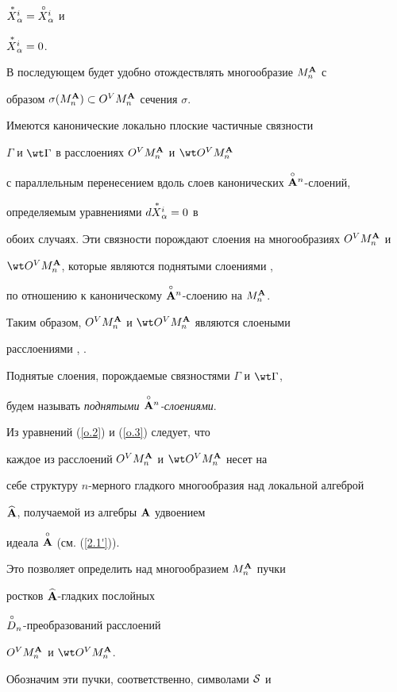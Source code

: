 ${\overset{\,\ast}{X}{}}{}_\alpha^i={\overset{\,\circ}{X}{}}{}_\alpha^i$ и


${\overset{\,\ast}{X}{}}{}_\alpha^i=0$.


В последующем будет удобно отождествлять многообразие $M^{\bold A}_n$ с


образом $\sigma(M^{\bold A}_n)\subset O^VM^{\bold A}_n$ сечения $\sigma$.





Имеются канонические локально плоские частичные \cite{Kam-T} связности


$\Gamma$ и $\wt\Gamma$ в расслоениях $O^VM^{\bold A}_n$ и $\wt O^VM^\A_n$


с параллельным перенесением вдоль слоев канонических $\overset{\circ}{\bold A}{}^n$-слоений,


определяемым уравнениями $d{\overset{\,\ast}{X}{}}{}_\alpha^i=0$ в


обоих случаях. Эти связности порождают слоения на многообразиях $O^VM^{\bold A}_n$ и


$\wt O^VM^\A_n$, которые являются поднятыми слоениями \cite{Kam-T},


\cite{Mol} по отношению к каноническому $\overset{\circ}{\bold A}{}^n$-слоению на $M^{\bold A}_n$.


Таким образом, $O^VM^{\bold A}_n$ и $\wt O^VM^\A_n$ являются слоеными


расслоениями  \cite{Kam-T}, \cite{Mol}.


Поднятые слоения, порождаемые связностями $\Gamma$ и $\wt\Gamma$,


будем называть {\it поднятыми $\overset{\circ}{\bold A}{}^n$-слоениями}.





Из уравнений (\ref{o.2}) и (\ref{o.3}) следует, что


каждое из расслоений $O^VM^{\bold A}_n$ и $\wt O^VM^\A_n$ несет на


себе структуру $n$-мерного гладкого многообразия над локальной алгеброй


$\widehat{{\bold A}}$, получаемой из алгебры ${\bold A}$ удвоением


идеала $\overset{\circ}{\bold A}{}$ (см.  (\ref{2.1'})).


Это позволяет определить над многообразием $M^{\bold A}_n$ пучки


ростков $\widehat{{\bold A}}$-гладких послойных


${\overset{\,\circ}{D}{}}_n$-преобразований расслоений


$O^VM^{\bold A}_n$ и $\wt O^VM^\A_n$.


Обозначим эти пучки, соответственно, символами ${\cal S}$ и


